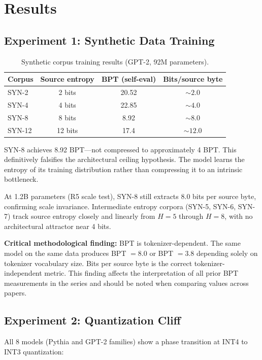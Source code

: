 \documentclass[11pt]{article}
\begin{document}
\section{Results}

\subsection{Experiment 1: Synthetic Data Training}

\begin{table}[ht]
\centering
\caption{Synthetic corpus training results (GPT-2, 92M parameters).}
\begin{tabular}{lccc}
\toprule
Corpus & Source entropy & BPT (self-eval) & Bits/source byte \\
\midrule
SYN-2 & 2 bits & 20.52 & ${\sim}2.0$ \\
SYN-4 & 4 bits & 22.85 & ${\sim}4.0$ \\
SYN-8 & 8 bits & 8.92 & ${\sim}8.0$ \\
SYN-12 & 12 bits & 17.4 & ${\sim}12.0$ \\
\bottomrule
\end{tabular}
\label{tab:synthetic}
\end{table}

SYN-8 achieves 8.92 BPT---not compressed to approximately 4 BPT. This definitively falsifies the architectural ceiling hypothesis. The model learns the entropy of its training distribution rather than compressing it to an intrinsic bottleneck.

At 1.2B parameters (R5 scale test), SYN-8 still extracts 8.0 bits per source byte, confirming scale invariance. Intermediate entropy corpora (SYN-5, SYN-6, SYN-7) track source entropy closely and linearly from $H = 5$ through $H = 8$, with no architectural attractor near 4 bits.

\textbf{Critical methodological finding:} BPT is tokenizer-dependent. The same model on the same data produces BPT $= 8.0$ or BPT $= 3.8$ depending solely on tokenizer vocabulary size. Bits per source byte is the correct tokenizer-independent metric. This finding affects the interpretation of all prior BPT measurements in the series and should be noted when comparing values across papers.

\subsection{Experiment 2: Quantization Cliff}

All 8 models (Pythia and GPT-2 families) show a phase transition at INT4 to INT3 quantization:
\end{document}
